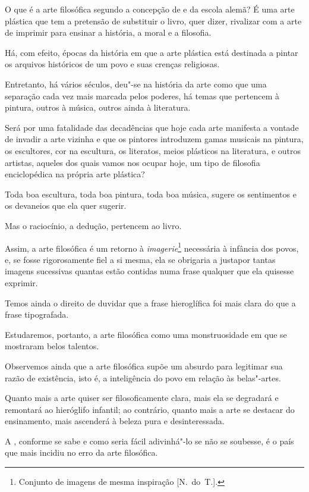 O que é a arte filosófica segundo a concepção de  e da escola
alemã? É uma arte plástica que tem a pretensão de substituir o livro,
quer dizer, rivalizar com a arte de imprimir para ensinar a história, a
moral e a filosofia.

Há, com efeito, épocas da história em que a arte plástica está destinada
a pintar os arquivos históricos de um povo e suas crenças religiosas.

Entretanto, há vários séculos, deu"-se na história da arte como que uma
separação cada vez mais marcada pelos poderes, há temas que pertencem à
pintura, outros à música, outros ainda à literatura.

Será por uma fatalidade das decadências que hoje cada arte manifesta a
vontade de invadir a arte vizinha e que os pintores introduzem gamas
musicais na pintura, os escultores, cor na escultura, os literatos,
meios plásticos na literatura, e outros artistas, aqueles dos quais
vamos nos ocupar hoje, um tipo de filosofia enciclopédica na própria
arte plástica?

Toda boa escultura, toda boa pintura, toda boa música, sugere os
sentimentos e os devaneios que ela quer sugerir.

Mas o raciocínio, a dedução, pertencem ao livro.

Assim, a arte filosófica é um retorno à \textit{imagerie}\footnote{ Conjunto 
de imagens de mesma inspiração [N.~do~T.].}\textit{
}necessária à infância dos povos, e, se fosse rigorosamente fiel a si
mesma, ela se obrigaria a justapor tantas imagens sucessivas quantas
estão contidas numa frase qualquer que ela quisesse exprimir.

Temos ainda o direito de duvidar que a frase hieroglífica foi mais clara
do que a frase tipografada.

Estudaremos, portanto, a arte filosófica como uma monstruosidade em que
se mostraram belos talentos.

Observemos ainda que a arte filosófica supõe um absurdo para legitimar
sua razão de existência, isto é, a inteligência do povo em relação às
belas"-artes.

Quanto mais a arte quiser ser filosoficamente clara, mais ela se
degradará e remontará ao hieróglifo infantil; ao contrário, quanto mais
a arte se destacar do ensinamento, mais ascenderá à beleza pura e
desinteressada.

A , conforme se sabe e como seria fácil adivinhá"-lo se não se
soubesse, é o país que mais incidiu no erro da arte filosófica.


